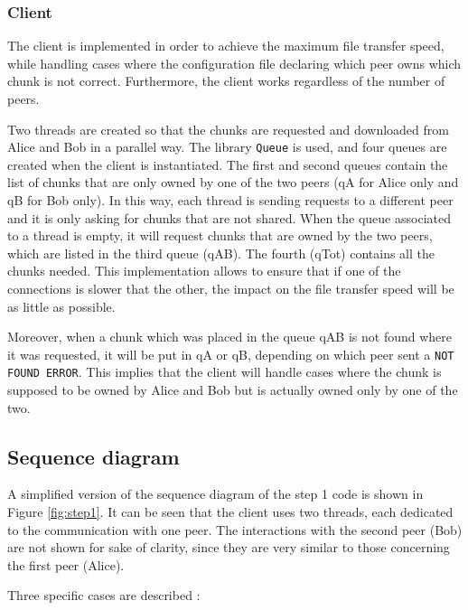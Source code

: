 \subsubsection{Client}

The client is implemented in order to achieve the maximum file transfer speed, while handling cases where the configuration file declaring which peer owns which chunk is not correct. Furthermore, the client works regardless of the number of peers.

Two threads are created so that the chunks are requested and downloaded from Alice and Bob in a parallel way. The library \texttt{Queue} is used, and four queues are created when the client is instantiated. The first and second queues contain the list of chunks that are only owned by one of the two peers (qA for Alice only and qB for Bob only). In this way, each thread is sending requests to a different peer and it is only asking for chunks that are not shared. When the queue associated to a thread is empty, it will request chunks that are owned by the two peers, which are listed in the third queue (qAB). The fourth (qTot) contains all the chunks needed. This implementation allows to ensure that if one of the connections is slower that the other, the impact on the file transfer speed will be as little as possible.

Moreover, when a chunk which was placed in the queue qAB is not found where it was requested, it will be put in qA or qB, depending on which peer sent a \texttt{NOT FOUND ERROR}. This implies that the client will handle cases where the chunk is supposed to be owned by Alice and Bob but is actually owned only by one of the two.

\subsection{Sequence diagram}

A simplified version of the sequence diagram of the step 1 code is shown in Figure \ref{fig:step1}. It can be seen that the client uses two threads, each dedicated to the communication with one peer. The interactions with the second peer (Bob) are not shown for sake of clarity, since they are very similar to those concerning the first peer (Alice).

Three specific cases are described : 

